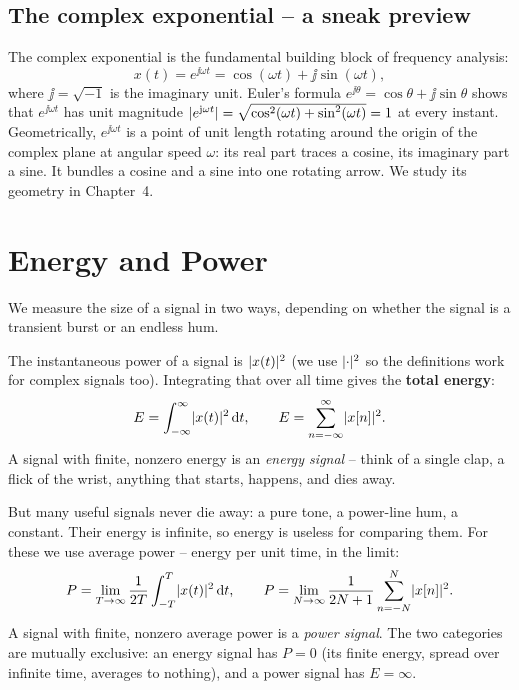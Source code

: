 \subsection{The complex exponential -- a sneak preview}

The complex exponential is the fundamental building block of frequency analysis:
\[
  x(t) = e^{\jj \omega t} = \cos(\omega t) + \jj\sin(\omega t),
\]
where $\jj = \sqrt{-1}$ is the imaginary unit.
Euler's formula $e^{\jj \theta} = \cos\theta + \jj\sin\theta$ shows that $e^{\jj\omega t}$ has unit magnitude
$\lvert e^{\mathrm{j}\omega t}\rvert = \sqrt{\cos^2(\omega t) + \sin^2(\omega t)} = 1$ at every instant.
Geometrically, $e^{\jj\omega t}$ is a point of unit length rotating around the origin of the complex plane at angular speed $\omega$:
its real part traces a cosine, its imaginary part a sine. It bundles a cosine and a
sine into one rotating arrow. We study its geometry in Chapter~4.

\section{Energy and Power}
\label{ch02:energy-power}

We measure the size of a signal in two ways, depending on whether the signal is a transient burst or an endless hum.

The instantaneous power of a signal is $\lvert x(t)\rvert^2$ (we use $\lvert\cdot\rvert^2$ so
the definitions work for complex signals too). Integrating that over all time gives
the \textbf{total energy}:
\[
  E = \int_{-\infty}^{\infty} \lvert x(t)\rvert^2 \,\mathrm{d} t,
  \qquad
  E = \sum_{n=-\infty}^{\infty} \lvert x[n]\rvert^2 .
\]
A signal with finite, nonzero energy is an \emph{energy signal} -- think of a
single clap, a flick of the wrist, anything that starts, happens, and dies away.

But many useful signals never die away: a pure tone, a power-line hum, a constant.
Their energy is infinite, so energy is useless for comparing them. For these we use
average power -- energy per unit time, in the limit:
\[
  P = \lim_{T\to\infty}\frac{1}{2T}\int_{-T}^{T}\lvert x(t)\rvert^2\,\mathrm{d} t,
  \qquad
  P = \lim_{N\to\infty}\frac{1}{2N+1}\sum_{n=-N}^{N}\lvert x[n]\rvert^2 .
\]
A signal with finite, nonzero average power is a \emph{power signal}. The two
categories are mutually exclusive: an energy signal has $P = 0$ (its finite energy,
spread over infinite time, averages to nothing), and a power signal has
$E = \infty$.

